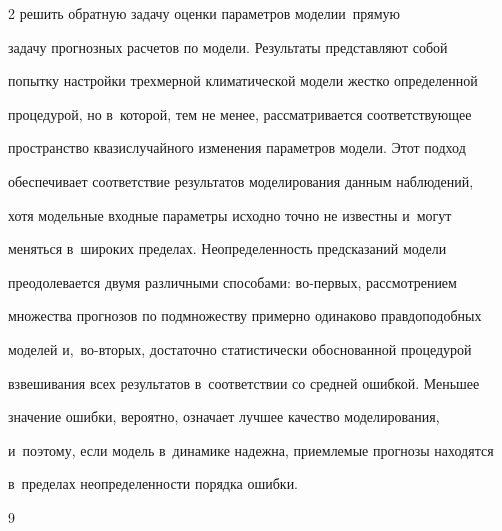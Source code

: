 \begin{multicols}{2}
 решить обратную задачу оценки параметров модели\linebreak и~прямую 


задачу прогнозных расчетов по модели. Результаты представляют собой 


попытку настройки трехмерной климатической модели жестко определенной 


процедурой, но в~которой, тем не менее, рассматривается соответствующее 


пространство квазислучайного изменения параметров модели. Этот подход 


обеспечивает соответствие результатов моделирования данным наблюдений, 


хотя модельные входные параметры исходно точно не известны и~могут 


меняться в~широких пределах. Неопределенность предсказаний модели 


преодолевается двумя различными способами: во-пер\-вых, рассмотрением 


множества прогнозов по подмножеству примерно одинаково правдоподобных 


моделей и,~во-вто\-рых, достаточно статистически обосно\-ван\-ной процедурой 


взвешивания всех результатов в~соответствии со средней ошибкой. Меньшее 


значение ошибки, вероятно, означает лучшее качество моделирования, 


и~поэтому, если модель в~динамике надежна, приемлемые прогнозы находятся 


в~пределах неопределенности порядка ошибки. 





\vspace*{-20pt}


  


{\small\frenchspacing


 {%




 \begin{thebibliography}{9}


 


 \vspace*{-2pt}


 





\end{thebibliography}}}
\end{multicols}
